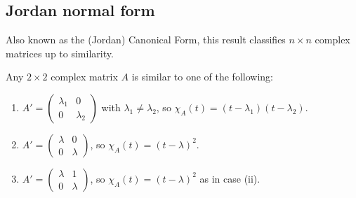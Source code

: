\subsection{Jordan normal form}
Also known as the (Jordan) Canonical Form, this result classifies \(n\times n\) complex matrices up to similarity.
\begin{proposition}
	Any \(2\times 2\) complex matrix \(A\) is similar to one of the following:
	\begin{enumerate}
		\item \(A' = \begin{pmatrix}
			      \lambda_1 & 0         \\
			      0         & \lambda_2
		      \end{pmatrix}\) with \(\lambda_1 \neq \lambda_2\), so \(\chi_A(t) = (t - \lambda_1)(t - \lambda_2)\).
		\item \(A' = \begin{pmatrix}
			      \lambda & 0       \\
			      0       & \lambda
		      \end{pmatrix}\), so \(\chi_A(t) = (t - \lambda)^2\).
		\item \(A' = \begin{pmatrix}
			      \lambda & 1       \\
			      0       & \lambda
		      \end{pmatrix}\), so \(\chi_A(t) = (t - \lambda)^2\) as in case (ii).
	\end{enumerate}
\end{proposition}
